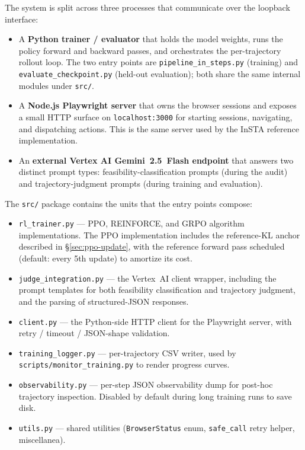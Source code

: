 \documentclass[12pt,a4paper]{report}
\begin{document}
The system is split across three processes that communicate over the loopback interface:
\begin{itemize}
  \item A \textbf{Python trainer / evaluator} that holds the model weights, runs the policy forward and backward passes, and orchestrates the per-trajectory rollout loop. The two entry points are \texttt{pipeline\_in\_steps.py} (training) and \texttt{evaluate\_checkpoint.py} (held-out evaluation); both share the same internal modules under \texttt{src/}.
  \item A \textbf{Node.js Playwright server} that owns the browser sessions and exposes a small HTTP surface on \texttt{localhost:3000} for starting sessions, navigating, and dispatching actions. This is the same server used by the InSTA reference implementation.
  \item An \textbf{external Vertex AI Gemini~2.5~Flash endpoint} that answers two distinct prompt types: feasibility-classification prompts (during the audit) and trajectory-judgment prompts (during training and evaluation).
\end{itemize}

The \texttt{src/} package contains the units that the entry points compose:
\begin{itemize}
  \item \texttt{rl\_trainer.py} --- PPO, REINFORCE, and GRPO algorithm implementations. The PPO implementation includes the reference-KL anchor described in \S\ref{sec:ppo-update}, with the reference forward pass scheduled (default: every 5th update) to amortize its cost.
  \item \texttt{judge\_integration.py} --- the Vertex~AI client wrapper, including the prompt templates for both feasibility classification and trajectory judgment, and the parsing of structured-JSON responses.
  \item \texttt{client.py} --- the Python-side HTTP client for the Playwright server, with retry / timeout / JSON-shape validation.
  \item \texttt{training\_logger.py} --- per-trajectory CSV writer, used by \texttt{scripts/monitor\_training.py} to render progress curves.
  \item \texttt{observability.py} --- per-step JSON observability dump for post-hoc trajectory inspection. Disabled by default during long training runs to save disk.
  \item \texttt{utils.py} --- shared utilities (\texttt{BrowserStatus} enum, \texttt{safe\_call} retry helper, miscellanea).
\end{itemize}
\end{document}
